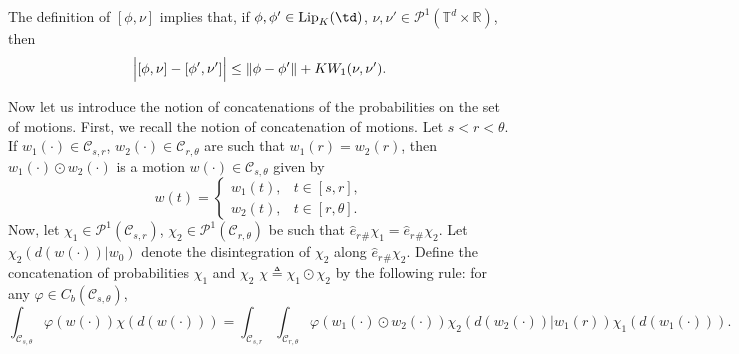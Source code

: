 \documentclass[a4paper,12pt]{article}
\newcommand{\tdr}{\mathbb{T}^{d}\times\mathbb{R}}
\begin{document}
The definition of $[\phi,\nu]$ implies that, if $\phi,\phi'\in\mathrm{Lip}_K(\td)$, $\nu,\nu'\in\mathcal{P}^1(\tdr)$, then
\begin{equation}
\label{estima:action_continuous}
\Bigl|[\phi,\nu]-[\phi',\nu']\Bigr|\leq \|\phi-\phi'\|+KW_1(\nu,\nu').
\end{equation}





Now let us introduce the notion of concatenations of the  probabilities on  the set of motions. First, we recall the notion of concatenation of motions. Let $s<r<\theta$. If $w_1(\cdot)\in\mathcal{C}_{s,r}$, $w_2(\cdot)\in\mathcal{C}_{r,\theta}$ are such that $w_1(r)=w_2(r)$, then $w_1(\cdot)\odot w_2(\cdot)$ is a motion $w(\cdot)\in\mathcal{C}_{s,\theta}$ given by
\begin{equation}\label{intro:concatination_mothions}
w(t)=\left\{\begin{array}{cc}
w_1(t), & t\in [s,r], \\
w_2(t), & t\in [r,\theta].
\end{array}\right. 
\end{equation}
Now, let $\chi_1\in\mathcal{P}^1(\mathcal{C}_{s,r})$, $\chi_2\in\mathcal{P}^1(\mathcal{C}_{r,\theta})$ be such that $\hat{e}_r{}_\#\chi_1=\hat{e}_r{}_\#\chi_2$. Let $\chi_2(d(w(\cdot))|w_0)$ denote the disintegration of $\chi_2$ along $\hat{e}_r{}_\#\chi_2$. Define the concatenation of probabilities $\chi_1$ and $\chi_2$ $\chi\triangleq\chi_1\odot\chi_2$ by the following rule: for any $\varphi\in C_b(\mathcal{C}_{s,\theta})$,
\begin{equation}\label{intro:concatination}
\int_{\mathcal{C}_{s,\theta}}\varphi(w(\cdot))\chi(d(w(\cdot)))=
\int_{\mathcal{C}_{s,r}}\int_{\mathcal{C}_{r,\theta}}\varphi(w_1(\cdot)\odot w_2(\cdot))\chi_2(d(w_2(\cdot))|w_1(r))\chi_1(d(w_1(\cdot))).
\end{equation} 
\end{document}
